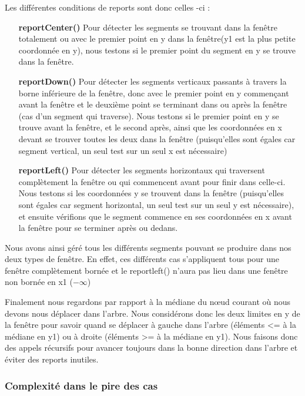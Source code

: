 \documentclass[10pt,a4paper]{article}
\begin{document}
Les différentes conditions de reports sont donc celles -ci :\begin{itemize}
\item[\textbf{reportCenter()}] Pour détecter les segments se trouvant dans la fenêtre totalement ou avec le premier point en y dans la fenêtre(y1 est la plus petite coordonnée en y), nous testons si le premier point du segment en y se trouve dans la fenêtre.

\item[\textbf{reportDown()}] Pour détecter les segments verticaux passants à travers la borne inférieure de la fenêtre, donc avec le premier point en y commençant avant la fenêtre et le deuxième point se terminant dans ou après la fenêtre (cas d'un segment qui traverse). Nous testons si le premier point en y se trouve avant la fenêtre, et le second après, ainsi que les coordonnées en x devant se trouver toutes les deux dans la fenêtre (puisqu'elles sont égales car segment vertical, un seul test sur un seul x est nécessaire)

\item[\textbf{reportLeft()}] Pour détecter les segments horizontaux qui traversent complètement la fenêtre ou qui commencent avant pour finir dans celle-ci. Nous testons si les coordonnées y se trouvent dans la fenêtre (puisqu'elles sont égales car segment horizontal, un seul test sur un seul y est nécessaire), et ensuite vérifions que le segment commence en ses coordonnées en x avant la fenêtre pour se terminer après ou dedans.
    
\end{itemize}
Nous avons ainsi géré tous les différents segments pouvant se produire dans nos deux types de fenêtre. En effet, ces différents cas s'appliquent tous pour une fenêtre complètement bornée et le reportleft() n'aura pas lieu dans une fenêtre non bornée en x1 ($-\infty$)

Finalement nous regardons par rapport à la médiane du nœud courant où nous devons nous déplacer dans l'arbre. Nous considérons donc les deux limites en y de la fenêtre pour savoir quand se déplacer à gauche dans l'arbre (éléments <= à la médiane en y1) ou à droite (éléments >= à la médiane en y1). Nous faisons donc des appels récursifs pour avancer toujours dans la bonne direction dans l'arbre et éviter des reports inutiles.

\subsubsection{Complexité dans le pire des cas}
\end{document}
